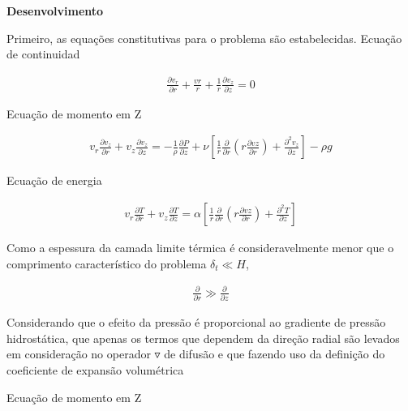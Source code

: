 \documentclass[12pt]{article}
\begin{document}
\textbf{Desenvolvimento} 

Primeiro, as equações constitutivas para o problema são estabelecidas.
Ecuação  de continuidad

\begin{equation}
	\begin{aligned}
		\frac{\partial v_{r}}{\partial r} + \frac{ vr}{ r} + \frac{1 }{ r}\frac{\partial v_{z}}{\partial z} = 0
	\end{aligned}
\end{equation}

Ecuação  de momento em Z

\begin{equation}
	\begin{aligned}
		v_{r}\frac{\partial v_{z}}{\partial r} + v_{z}\frac{\partial v_{z}}{\partial z} = -\frac{1}{\rho} \frac{\partial P}{\partial z} + \nu \left[ \frac{1}{r} \frac{\partial}{\partial r}\left( r\frac{\partial vz}{\partial r}\right) + \frac{\partial^{2}v_{z}}{\partial z} \right] - \rho g 
	\end{aligned}
\end{equation}

Ecuação  de energia

\begin{equation}
	\begin{aligned}
		v_{r}\frac{\partial T}{\partial r} + v_{z}\frac{\partial T}{\partial z} =  \alpha \left[ \frac{1}{r} \frac{\partial}{\partial r}\left( r\frac{\partial vz}{\partial r}\right) + \frac{\partial^{2}T}{\partial z} \right] 
	\end{aligned}
\end{equation}

Como a espessura da camada limite térmica é consideravelmente menor que o comprimento característico do problema $\delta_{t} \ll H$,


\begin{equation}
	\begin{aligned}
		\frac{\partial }{\partial r} \gg \frac{\partial }{\partial z} 
	\end{aligned}
\end{equation}

Considerando que o efeito da pressão é proporcional ao gradiente de pressão hidrostática, que apenas os termos que dependem da direção radial são levados em consideração no operador $\triangledown$ de difusão e que fazendo uso da definição do coeficiente de expansão volumétrica


Ecuação  de momento em Z
\end{document}
